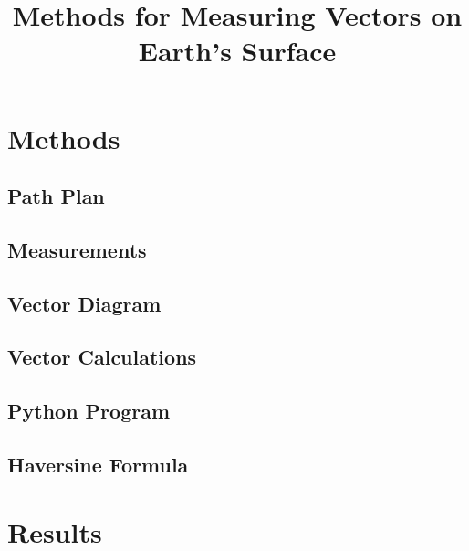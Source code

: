 \documentclass[stu,12pt,biblatex]{apa7}
\title{Methods for Measuring Vectors on Earth's Surface}
\begin{document}
\maketitle
%

\section{Methods}
\subsection{Path Plan}
%
\subsection{Measurements}
%
\subsection{Vector Diagram}
%
\subsection{Vector Calculations}
%
\subsection{Python Program}

\subsection{Haversine Formula}
%

\section{Results}
%

\end{document}
